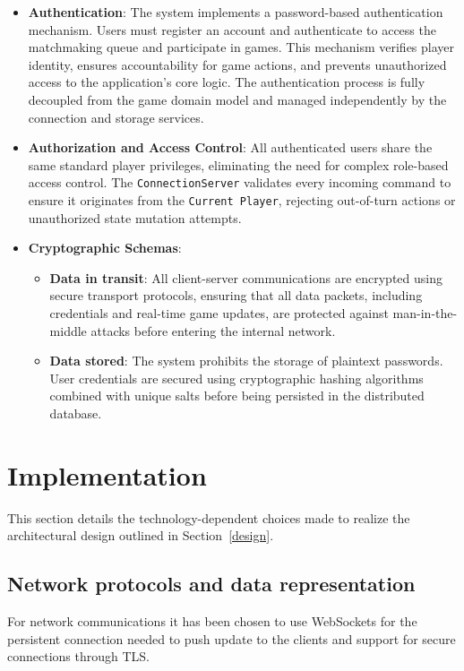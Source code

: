 \documentclass{scrartcl}
\begin{document}
\begin{itemize}
    \item \textbf{Authentication}: The system implements a password-based authentication mechanism. Users must register an account and authenticate to access the matchmaking queue and participate in games. This mechanism verifies player identity, ensures accountability for game actions, and prevents unauthorized access to the application's core logic. The authentication process is fully decoupled from the game domain model and managed independently by the connection and storage services.
    
    \item \textbf{Authorization and Access Control}: All authenticated users share the same standard player privileges, eliminating the need for complex role-based access control. The \texttt{ConnectionServer} validates every incoming command to ensure it originates from the \texttt{Current Player}, rejecting out-of-turn actions or unauthorized state mutation attempts.
    
    \item \textbf{Cryptographic Schemas}:
    \begin{itemize}
        \item \textbf{Data in transit}: All client-server communications are encrypted using secure transport protocols, ensuring that all data packets, including credentials and real-time game updates, are protected against man-in-the-middle attacks before entering the internal network.
        \item \textbf{Data stored}: The system prohibits the storage of plaintext passwords. User credentials are secured using cryptographic hashing algorithms combined with unique salts before being persisted in the distributed database.
    \end{itemize}
\end{itemize}

\section{Implementation}\label{implementation}
This section details the technology-dependent choices made to realize the architectural design outlined in Section~\ref{design}.
\subsection*{Network protocols and data representation}
For network communications it has been chosen to use WebSockets for the persistent connection needed
to push update to the clients and support for secure connections through TLS.%
\end{document}
